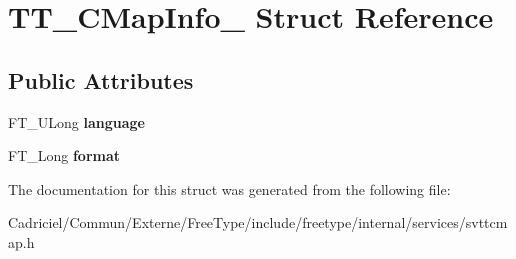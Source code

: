 \hypertarget{struct_t_t___c_map_info__}{\section{T\-T\-\_\-\-C\-Map\-Info\-\_\- Struct Reference}
\label{struct_t_t___c_map_info__}
}
\subsection*{Public Attributes}
\begin{DoxyCompactItemize}
\item 
\hypertarget{struct_t_t___c_map_info___a4096f460af57f87cb9434a411c502d86}{F\-T\-\_\-\-U\-Long {\bfseries language}}\label{struct_t_t___c_map_info___a4096f460af57f87cb9434a411c502d86}

\item 
\hypertarget{struct_t_t___c_map_info___a122d56b4755597f134fcf4865cb0a4fc}{F\-T\-\_\-\-Long {\bfseries format}}\label{struct_t_t___c_map_info___a122d56b4755597f134fcf4865cb0a4fc}

\end{DoxyCompactItemize}


The documentation for this struct was generated from the following file\-:\begin{DoxyCompactItemize}
\item 
Cadriciel/\-Commun/\-Externe/\-Free\-Type/include/freetype/internal/services/svttcmap.\-h\end{DoxyCompactItemize}
